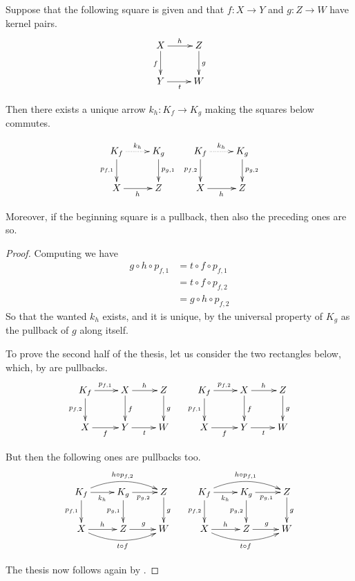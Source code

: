 \begin{lemma}\label{lem:salvavita1}
Suppose that the following square is given and that $f\colon X\to Y$ and $g\colon Z\to W$ have kernel pairs.
\[\xymatrix{X \ar[d]_{f}\ar[r]^{h}& Z \ar[d]^{g} \\ Y \ar[r]_{t}& W}\]

Then there exists a unique arrow $k_h\colon K_f\to K_g$ making the squares below commutes.

\[\xymatrix{K_f \ar[d]_{p_{f, 1}}\ar@{.>}[r]^{k_h}& K_g \ar[d]^{p_{g,1}} & K_f \ar[d]_{p_{f,2}}\ar@{.>}[r]^{k_h}& K_g \ar[d]^{p_{g,2}} \\ X \ar[r]_{h}& Z & X \ar[r]_{h}& Z}\]

Moreover, if the beginning square is a pullback, then also the preceding ones are so.
\end{lemma}
\begin{proof}
	Computing we have
	\begin{align*}
		g\circ h\circ p_{f,1}&=t\circ f\circ p_{f,1}\\&=t\circ f\circ p_{f,2}\\&=g\circ h\circ p_{f,2}
	\end{align*}
	So that the wanted $k_h$ exists, and it is unique, by the universal property of $K_g$ as the pullback of $g$ along itself. 
	
	To prove the second half of the thesis, let us consider the  two rectangles below, which, by  are pullbacks.
\[\xymatrix{K_f\ar[r]^{p_{f,1}}  \ar[d]_{p_{f,2}}& X \ar[r]^{h} \ar[d]^{f} & Z \ar[d]^{g} & K_f \ar[r]^{p_{f,2}}  \ar[d]_{p_{f,1}} & X \ar[d]^{f} \ar[r]^{h}& Z \ar[d]^{g}\\
	X \ar[r]_{f}& Y \ar[r]_{t}& W&  X \ar[r]_f & Y\ar[r]_{t} & W}\]
	
	But then the following ones are pullbacks too.
 	\[\xymatrix{K_f \ar@/^.4cm/[rr]^{h\circ p_{f,2}} \ar[r]_{k_h} \ar[d]_{p_{f,1}}& K_g  \ar[r]_{p_{g,2}} \ar[d]_{p_{g,1}} & Z \ar[d]^{g} & K_f \ar@/^.4cm/[rr]^{h\circ p_{f,1}} \ar[r]_{k_h} \ar[d]_{p_{f,2}}& K_g \ar[r]_{p_{g,1}} \ar[d]_{p_{g,2}} & Z \ar[d]^{g}\\X \ar@/_.4cm/[rr]_{t\circ f}\ar[r]^{h}& Z \ar[r]^{g} & W & X \ar@/_.4cm/[rr]_{t\circ f} \ar[r]^{h}& Z \ar[r]^{g}& W}\]
 	
 	The thesis now follows again by .
\end{proof}


